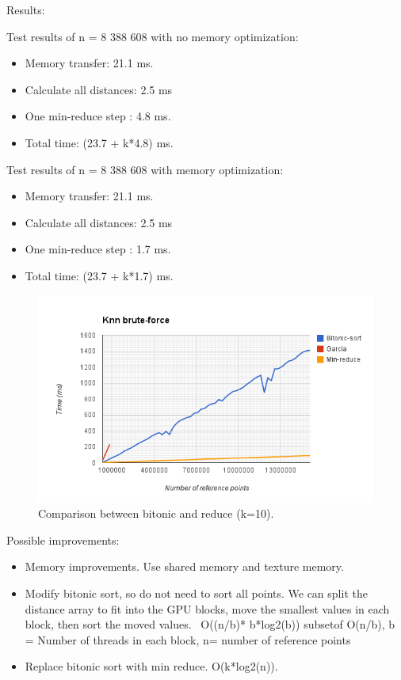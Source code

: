 Results:

Test results of n = 8 388 608 with no memory optimization:
\begin{itemize}
    \item Memory transfer:  21.1 ms.
    \item Calculate all distances: 2.5 ms
    \item One min-reduce step : 4.8 ms.
    \item Total time: (23.7 + k*4.8) ms.
\end{itemize}

Test results of n = 8 388 608 with memory optimization:
\begin{itemize}
    \item Memory transfer:  21.1 ms.
    \item Calculate all distances: 2.5 ms
    \item One min-reduce step : 1.7 ms.
    \item Total time: (23.7 + k*1.7) ms.
\end{itemize}

\begin{figure}[ht!]
\centering
\includegraphics[width=120mm]{../gfx/BitonicVSreduce.png}

\caption{Comparison between bitonic and reduce (k=10).}
\label{fig:bitonic_vs_reduce}
\end{figure}

Possible improvements:

\begin{itemize}
    \item Memory improvements. Use shared memory and texture memory.
    \item Modify bitonic sort, so do not need to sort all points. We can split the distance array to fit into the GPU blocks, move the smallest values in each block, then sort the moved values. ~O((n/b)* b*log2(b)) subsetof O(n/b), b = Number of threads in each block, n= number of reference points
    \item Replace bitonic sort with min reduce. O(k*log2(n)).
\end{itemize}

